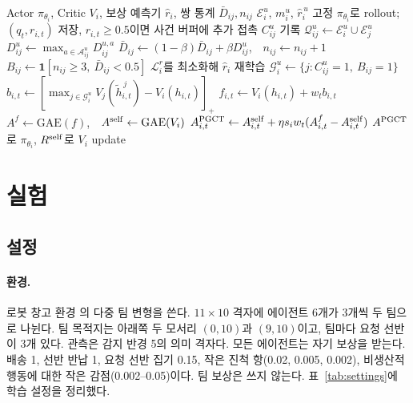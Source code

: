 \documentclass[10pt,twocolumn,letterpaper]{article}
\begin{document}
\begin{algorithm}[tb]
\caption{에이전트 $i$의 PGCT update $u$}
\label{alg:pgct}
\begin{algorithmic}[1]
\REQUIRE Actor $\pi_{\theta_i}$, Critic $V_i$, 보상 예측기 $\widehat r_i$, 쌍 통계 $\bar D_{ij},n_{ij}$
\STATE $\mathcal E_i^u$, $m_i^u$, $\widehat r_i^{\,u}$ 고정 
\STATE $\pi_{\theta_i}$로 rollout; $(q_t,r_{i,t})$ 저장, $r_{i,t}\ge0.5$이면 사건 버퍼에 추가
\STATE 접촉 $C_{ij}^u$ 기록 
\STATE $\mathcal Q_{ij}^u\leftarrow\mathcal E_i^u\cup\mathcal E_j^u$
\STATE $D_{ij}^u\leftarrow\max_{a\in\mathcal A_{ij}^u}D_{ij}^{u,a}$ 
\STATE $\bar D_{ij}\leftarrow(1-\beta)\bar D_{ij}+\beta D_{ij}^u$,\ \ $n_{ij}\leftarrow n_{ij}+1$
\ENDIF
\STATE $B_{ij}\leftarrow\mathbf 1[n_{ij}\ge3,\ \bar D_{ij}<0.5]$ 
\ENDFOR
\STATE $\mathcal L_i^r$를 최소화해 $\widehat r_i$ 재학습 
\ENDIF
\STATE $\mathcal G_i^u\leftarrow\{j:C_{ij}^u=1,\ B_{ij}=1\}$
\STATE $b_{i,t}\leftarrow[\max_{j\in\mathcal G_i^u}V_j(\tilde h_{i,t}^{\,j})-V_i(h_{i,t})]_+$ 
\STATE $f_{i,t}\leftarrow V_i(h_{i,t})+w_tb_{i,t}$
\STATE $A^{f}\leftarrow\mathrm{GAE}(f)$,\ \ $A^{\rm self}\leftarrow\mathrm{GAE}(V_i)$ 
\STATE $A^{\rm PGCT}_{i,t}\leftarrow A^{\rm self}_{i,t}+\eta s_iw_t(A^f_{i,t}-A^{\rm self}_{i,t})$ 
\STATE $A^{\rm PGCT}$로 $\pi_{\theta_i}$, $R^{\rm self}$로 $V_i$ update 
\end{algorithmic}
\end{algorithm}

\section{실험}
\subsection{설정}\label{sec:setup}
\paragraph{환경.} 로봇 창고 환경 \citep{benchmark}의 다중 팀 변형을 쓴다. $11\times10$ 격자에 에이전트 6개가 3개씩 두 팀으로 나뉜다. 팀 목적지는 아래쪽 두 모서리 $(0,10)$과 $(9,10)$이고, 팀마다 요청 선반이 3개 있다. 관측은 감지 반경 5의 의미 격자다. 모든 에이전트는 자기 보상을 받는다. 배송 1, 선반 반납 1, 요청 선반 집기 0.15, 작은 진척 항(0.02, 0.005, 0.002), 비생산적 행동에 대한 작은 감점(0.002--0.05)이다. 팀 보상은 쓰지 않는다. 표~\ref{tab:settings}에 학습 설정을 정리했다.
\end{document}

